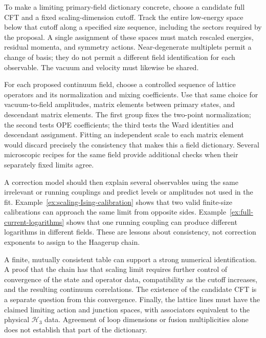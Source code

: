 To make a limiting primary-field dictionary concrete, choose a candidate full CFT and a
fixed scaling-dimension cutoff. Track the entire low-energy space below
that cutoff along a specified size sequence, including the sectors
required by the proposal. A single assignment of these spaces must
match rescaled energies, residual momenta, and symmetry actions.
Near-degenerate multiplets permit a change of basis; they do not permit
a different field identification for each observable. The vacuum and
velocity must likewise be shared.

For each proposed continuum field, choose a controlled sequence of
lattice operators and its normalization and mixing coefficients. Use
that same choice for vacuum-to-field amplitudes, matrix elements
between primary states, and descendant matrix elements. The first
group fixes the two-point normalization; the second tests OPE
coefficients; the third tests the Ward identities and descendant
assignment. Fitting an independent scale to each matrix element would
discard precisely the consistency that makes this a field dictionary.
Several microscopic recipes for the same field provide additional
checks when their separately fixed limits agree.

A correction model should then explain several observables using the
same irrelevant or running couplings and predict levels or amplitudes
not used in the fit. Example~\ref{ex:scaling-Ising-calibration} shows
that two valid finite-size calibrations can approach the same limit
from opposite sides. Example~\ref{ex:full-current-logarithms} shows
that one running coupling can produce different logarithms in different
fields. These are lessons about consistency, not correction exponents
to assign to the Haagerup chain.

A finite, mutually consistent table can support a strong numerical
identification. A proof that the chain has that scaling limit requires
further control of convergence of the state and operator data,
compatibility as the cutoff increases, and the resulting continuum
correlations. The existence of the candidate CFT is a separate
question from this convergence. Finally, the lattice lines must have
the claimed limiting action and junction spaces, with associators
equivalent to the physical $\mathcal H_3$ data. Agreement of loop dimensions
or fusion multiplicities alone does not establish that part of the
dictionary.

